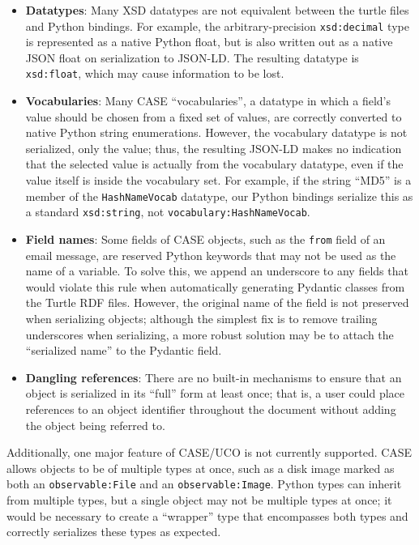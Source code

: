 \documentclass[letterpaper,12pt]{report}
\def\tightlist{}
\newcommand{\passthrough}[1]{#1}
\begin{document}
\begin{itemize}
\tightlist
\item
  \textbf{Datatypes}: Many XSD datatypes are not equivalent between the
  turtle files and Python bindings. For example, the arbitrary-precision
  \passthrough{\lstinline!xsd:decimal!} type is represented as a native
  Python float, but is also written out as a native JSON float on
  serialization to JSON-LD. The resulting datatype is
  \passthrough{\lstinline!xsd:float!}, which may cause information to be
  lost.
\item
  \textbf{Vocabularies}: Many CASE ``vocabularies'', a datatype in which
  a field's value should be chosen from a fixed set of values, are
  correctly converted to native Python string enumerations. However, the
  vocabulary datatype is not serialized, only the value; thus, the
  resulting JSON-LD makes no indication that the selected value is
  actually from the vocabulary datatype, even if the value itself is
  inside the vocabulary set. For example, if the string ``MD5'' is a
  member of the \passthrough{\lstinline!HashNameVocab!} datatype, our
  Python bindings serialize this as a standard
  \passthrough{\lstinline!xsd:string!}, not
  \passthrough{\lstinline!vocabulary:HashNameVocab!}.
\item
  \textbf{Field names}: Some fields of CASE objects, such as the
  \passthrough{\lstinline!from!} field of an email message, are reserved
  Python keywords that may not be used as the name of a variable. To
  solve this, we append an underscore to any fields that would violate
  this rule when automatically generating Pydantic classes from the
  Turtle RDF files. However, the original name of the field is not
  preserved when serializing objects; although the simplest fix is to
  remove trailing underscores when serializing, a more robust solution
  may be to attach the ``serialized name'' to the Pydantic field.
\item
  \textbf{Dangling references}: There are no built-in mechanisms to
  ensure that an object is serialized in its ``full'' form at least
  once; that is, a user could place references to an object identifier
  throughout the document without adding the object being referred to.
\end{itemize}

Additionally, one major feature of CASE/UCO is not currently supported.
CASE allows objects to be of multiple types at once, such as a disk
image marked as both an \passthrough{\lstinline!observable:File!} and an
\passthrough{\lstinline!observable:Image!}. Python types can inherit
from multiple types, but a single object may not be multiple types at
once; it would be necessary to create a ``wrapper'' type that
encompasses both types and correctly serializes these types as expected.
\end{document}
